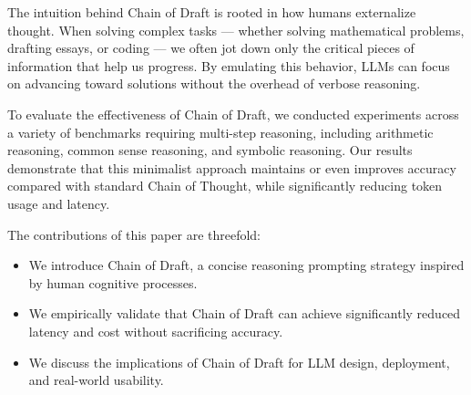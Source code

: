 The intuition behind Chain of Draft is rooted in how humans externalize thought. When solving complex tasks — whether solving mathematical problems, drafting essays, or coding — we often jot down only the critical pieces of information that help us progress. By emulating this behavior, LLMs can focus on advancing toward solutions without the overhead of verbose reasoning.

To evaluate the effectiveness of Chain of Draft, we conducted experiments across a variety of benchmarks requiring multi-step reasoning, including arithmetic reasoning, common sense reasoning, and symbolic reasoning. Our results demonstrate that this minimalist approach maintains or even improves accuracy compared with standard Chain of Thought, while significantly reducing token usage and latency. %

The contributions of this paper are threefold:
\begin{itemize}
    \item We introduce Chain of Draft, a concise reasoning prompting strategy inspired by human cognitive processes.
    \item We empirically validate that Chain of Draft can achieve significantly reduced latency and cost without sacrificing accuracy.
    \item We discuss the implications of Chain of Draft for LLM design, deployment, and real-world usability.
\end{itemize}


